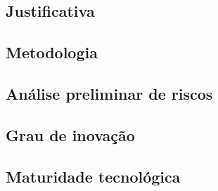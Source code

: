 
\subsection{Justificativa}
\label{ssec:just}

\subsection{Metodologia}
\label{ssec:metod}


\subsection{Análise preliminar de riscos}
\label{ssec:risco}

\subsection{Grau de inovação}
\label{ssec:inova}

\subsection{Maturidade tecnológica}
\label{ssec:trl}


